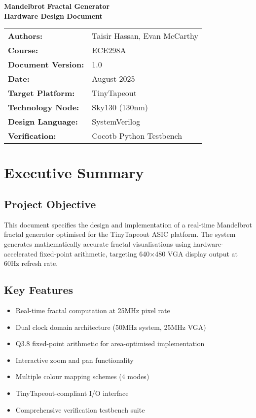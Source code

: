\documentclass[11pt,a4paper]{article}
\begin{document}
\begin{titlepage}
\centering
{\Huge\bfseries\color{darkblue} Mandelbrot Fractal Generator\\[0.5cm]}
{\Large\bfseries Hardware Design Document\\[2cm]}

\begin{tabular}{ll}
\textbf{Authors:} & Taisir Hassan, Evan McCarthy \\[0.3cm]
\textbf{Course:} & ECE298A \\[0.3cm]
\textbf{Document Version:} & 1.0 \\[0.3cm]
\textbf{Date:} & August 2025 \\[0.3cm]
\textbf{Target Platform:} & TinyTapeout \\[0.3cm]
\textbf{Technology Node:} & Sky130 (130nm) \\[0.3cm]
\textbf{Design Language:} & SystemVerilog \\[0.3cm]
\textbf{Verification:} & Cocotb Python Testbench \\[0.3cm]
\end{tabular}

\vfill
\end{titlepage}

\tableofcontents
\newpage

\section{Executive Summary}

\subsection{Project Objective}
This document specifies the design and implementation of a real-time Mandelbrot fractal generator optimised for the TinyTapeout ASIC platform. The system generates mathematically accurate fractal visualisations using hardware-accelerated fixed-point arithmetic, targeting 640×480 VGA display output at 60Hz refresh rate.

\subsection{Key Features}
\begin{itemize}
\item Real-time fractal computation at 25MHz pixel rate
\item Dual clock domain architecture (50MHz system, 25MHz VGA)
\item Q3.8 fixed-point arithmetic for area-optimised implementation
\item Interactive zoom and pan functionality
\item Multiple colour mapping schemes (4 modes)
\item TinyTapeout-compliant I/O interface
\item Comprehensive verification testbench suite
\end{itemize}
\end{document}
